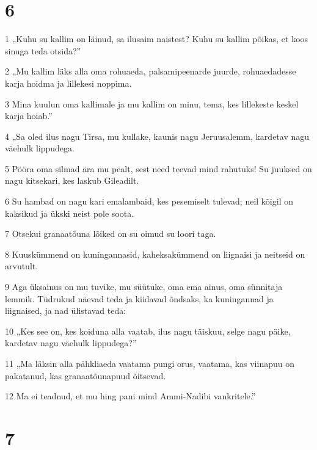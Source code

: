 \chapter{6}

\par 1 „Kuhu su kallim on läinud, sa ilusaim naistest? Kuhu su kallim põikas, et koos sinuga teda otsida?”
\par 2 „Mu kallim läks alla oma rohuaeda, palsamipeenarde juurde, rohuaedadesse karja hoidma ja lillekesi noppima.
\par 3 Mina kuulun oma kallimale ja mu kallim on minu, tema, kes lillekeste keskel karja hoiab.”
\par 4 „Sa oled ilus nagu Tirsa, mu kullake, kaunis nagu Jeruusalemm, kardetav nagu väehulk lippudega.
\par 5 Pööra oma silmad ära mu pealt, sest need teevad mind rahutuks! Su juuksed on nagu kitsekari, kes laskub Gileadilt.
\par 6 Su hambad on nagu kari emalambaid, kes pesemiselt tulevad; neil kõigil on kaksikud ja ükski neist pole soota.
\par 7 Otsekui granaatõuna lõiked on su oimud su loori taga.
\par 8 Kuuskümmend on kuningannasid, kaheksakümmend on liignaisi ja neitseid on arvutult.
\par 9 Aga üksainus on mu tuvike, mu süütuke, oma ema ainus, oma sünnitaja lemmik. Tüdrukud näevad teda ja kiidavad õndsaks, ka kuningannad ja liignaised, ja nad ülistavad teda:
\par 10 „Kes see on, kes koiduna alla vaatab, ilus nagu täiskuu, selge nagu päike, kardetav nagu väehulk lippudega?”
\par 11 „Ma läksin alla pähkliaeda vaatama pungi orus, vaatama, kas viinapuu on pakatanud, kas granaatõunapuud õitsevad.
\par 12 Ma ei teadnud, et mu hing pani mind Ammi-Nadibi vankritele.”

\chapter{7}

